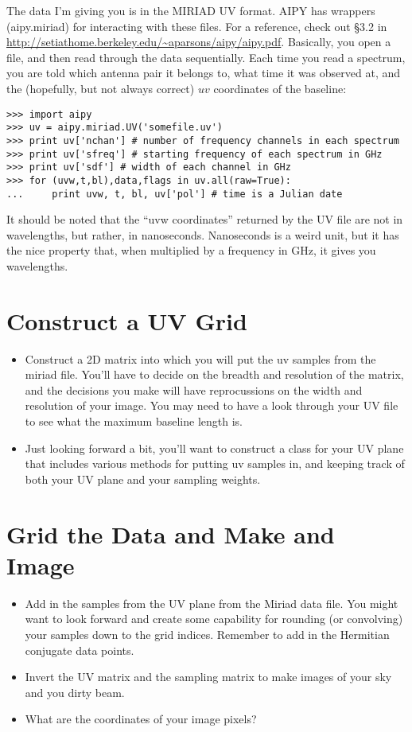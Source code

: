 \documentclass[11pt]{article}
\begin{document}
The data I'm giving you is in the MIRIAD UV format.  AIPY has wrappers (aipy.miriad) for interacting with
these files.  For a reference, check out \S3.2 in \url{http://setiathome.berkeley.edu/~aparsons/aipy/aipy.pdf}.
Basically, you open a file, and then read through the data sequentially.  Each time you read a spectrum,
you are told which antenna pair it belongs to, what time it was observed at, and the (hopefully, but
not always correct) $uv$ coordinates of the baseline:
\begin{verbatim}
>>> import aipy
>>> uv = aipy.miriad.UV('somefile.uv')
>>> print uv['nchan'] # number of frequency channels in each spectrum
>>> print uv['sfreq'] # starting frequency of each spectrum in GHz
>>> print uv['sdf'] # width of each channel in GHz
>>> for (uvw,t,bl),data,flags in uv.all(raw=True):
...     print uvw, t, bl, uv['pol'] # time is a Julian date
\end{verbatim}

It should be noted that the ``uvw coordinates'' returned by the UV file are not in wavelengths,
but rather, in nanoseconds.  Nanoseconds is a weird unit, but it has the nice property that,
when multiplied by a frequency in GHz, it gives you wavelengths.


\section{Construct a UV Grid}

\begin{itemize}
\item Construct a 2D matrix into which you will put the uv samples from the miriad file.  You'll have to
decide on the breadth and resolution of the matrix, and the decisions you make will have reprocussions on
the width and resolution of your image.  You may need to have a look through your UV file to see what
the maximum baseline length is.
\item Just looking forward a bit, you'll want to construct a class for your UV plane that includes
various methods for putting uv samples in, and keeping track of both your UV plane and your sampling weights.
\end{itemize}

\section{Grid the Data and Make and Image}

\begin{itemize}
\item Add in the samples from the UV plane from the Miriad data file.  You might want to look forward and
create some capability for rounding (or convolving) your samples down to the grid indices.  Remember to
add in the Hermitian conjugate data points.
\item Invert the UV matrix and the sampling matrix to make images of your sky and you dirty beam.
\item What are the coordinates of your image pixels?
\end{itemize}
\end{document}
